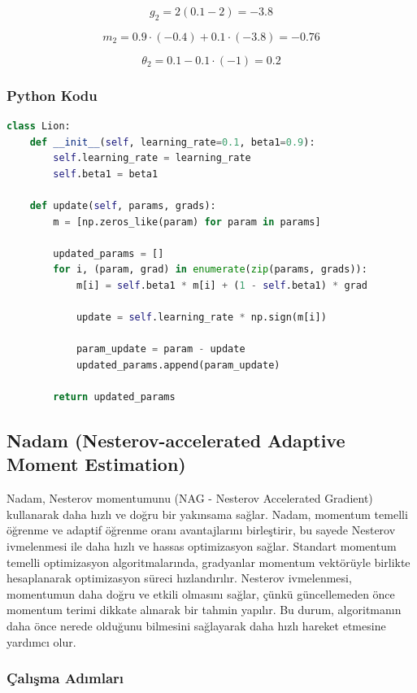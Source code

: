 \[ g_2 = 2 (0.1 - 2) = -3.8 \]

\[ m_2 = 0.9 \cdot (-0.4) + 0.1 \cdot (-3.8) = -0.76 \]

\[ \theta_2 = 0.1 - 0.1 \cdot (-1) = 0.2 \]

\subsubsection{Python Kodu}

\begin{lstlisting}[language=Python]
class Lion:
    def __init__(self, learning_rate=0.1, beta1=0.9):
        self.learning_rate = learning_rate
        self.beta1 = beta1

    def update(self, params, grads):
        m = [np.zeros_like(param) for param in params]

        updated_params = []
        for i, (param, grad) in enumerate(zip(params, grads)):
            m[i] = self.beta1 * m[i] + (1 - self.beta1) * grad

            update = self.learning_rate * np.sign(m[i])

            param_update = param - update
            updated_params.append(param_update)

        return updated_params
\end{lstlisting}

\newpage

\subsection{Nadam (Nesterov-accelerated Adaptive Moment Estimation)}

Nadam, Nesterov momentumunu (NAG - Nesterov Accelerated Gradient) kullanarak daha hızlı ve doğru bir yakınsama sağlar. Nadam, momentum temelli öğrenme ve adaptif öğrenme oranı avantajlarını birleştirir, bu sayede Nesterov ivmelenmesi ile daha hızlı ve hassas optimizasyon sağlar. Standart momentum temelli optimizasyon algoritmalarında, gradyanlar momentum vektörüyle birlikte hesaplanarak optimizasyon süreci hızlandırılır. Nesterov ivmelenmesi, momentumun daha doğru ve etkili olmasını sağlar, çünkü güncellemeden önce momentum terimi dikkate alınarak bir tahmin yapılır. Bu durum, algoritmanın daha önce nerede olduğunu bilmesini sağlayarak daha hızlı hareket etmesine yardımcı olur.

\subsubsection{Çalışma Adımları}

